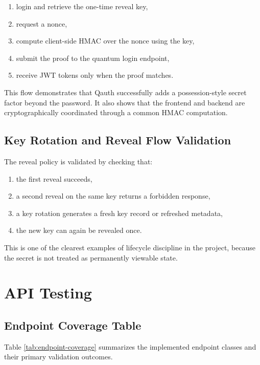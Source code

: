 \begin{enumerate}
    \item login and retrieve the one-time reveal key,
    \item request a nonce,
    \item compute client-side HMAC over the nonce using the key,
    \item submit the proof to the quantum login endpoint,
    \item receive JWT tokens only when the proof matches.
\end{enumerate}

This flow demonstrates that Qauth successfully adds a possession-style secret factor beyond the password. It also shows that the frontend and backend are cryptographically coordinated through a common HMAC computation.

\subsection{Key Rotation and Reveal Flow Validation}
The reveal policy is validated by checking that:

\begin{enumerate}
    \item the first reveal succeeds,
    \item a second reveal on the same key returns a forbidden response,
    \item a key rotation generates a fresh key record or refreshed metadata,
    \item the new key can again be revealed once.
\end{enumerate}

This is one of the clearest examples of lifecycle discipline in the project, because the secret is not treated as permanently viewable state.

\section{API Testing}

\subsection{Endpoint Coverage Table}
Table \ref{tab:endpoint-coverage} summarizes the implemented endpoint classes and their primary validation outcomes.

